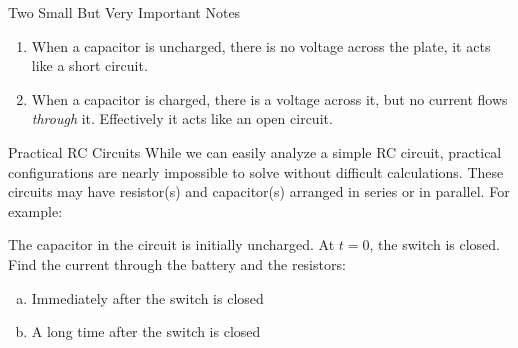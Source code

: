 \documentclass[12pt,aspectratio=169]{beamer}
\begin{document}
\begin{frame}{Two Small But Very Important Notes}
  \begin{enumerate}
  \item When a capacitor is uncharged, there is no voltage across the plate,
    it acts like a short circuit.
  \item When a capacitor is charged, there is a voltage across it, but no
    current flows \emph{through} it. Effectively it acts like an open circuit.
  \end{enumerate}
\end{frame}



\begin{frame}{Practical RC Circuits}
  While we can easily analyze a simple RC circuit, practical configurations are
  nearly impossible to solve without difficult calculations. These circuits may
  have resistor(s) and capacitor(s) arranged in series or in parallel. For
  example:
  \begin{center}
  \end{center}
  The capacitor in the circuit is initially uncharged. At $t=0$, the switch is
  closed. Find the current through the battery and the resistors:
  \begin{enumerate}[(a)]
  \item Immediately after the switch is closed
  \item A long time after the switch is closed
  \end{enumerate}
\end{frame}
\end{document}
